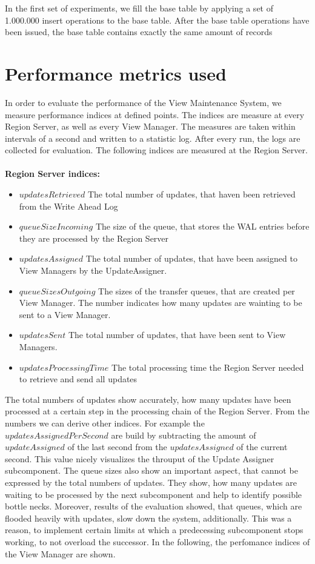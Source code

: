 \documentclass[11pt,a4paper,bibtotoc,idxtotoc,headsepline,footsepline,footexclude,BCOR12mm,DIV13]{scrbook}
\begin{document}
In the first set of experiments, we fill the base table by applying a set of 1.000.000 insert operations to the base table. After the base table operations have been issued, the base table contains exactly the same amount of records 

\section{Performance metrics used}
\label{sec:performancemetricsused}

In order to evaluate the performance of the View Maintenance System, we measure performance indices at defined points. The indices are measure at every Region Server, as well as every View Manager. The measures are taken within intervals of a second and written to a statistic log. After every run, the logs are collected for evaluation. The following indices are measured at the Region Server. \\\\
\textbf{Region Server indices:}
\begin{itemize}
	\item $updatesRetrieved$ The total number of updates, that haven been retrieved from the Write Ahead Log
	\item $queueSizeIncoming$ The size of the queue, that stores the WAL entries before they are processed by the Region Server
	\item $updatesAssigned$ The total number of updates, that have been assigned to View Managers by the UpdateAssigner.
	\item $queueSizesOutgoing$ The sizes of the transfer queues, that are created per View Manager. The number indicates how many updates are wainting to be sent to a View Manager.
	\item $updatesSent$ The total number of updates, that have been sent to View Managers.	
	\item $updatesProcessingTime$ The total processing time the Region Server needed to retrieve and send all updates
\end{itemize}
The total numbers of updates show accurately, how many updates have been processed at a certain step in the processing chain of the Region Server. From the numbers we can derive other indices. For example the $updatesAssignedPerSecond$ are build by subtracting the amount of $updateAssigned$ of the last second from the $updatesAssigned$ of the current second. This value nicely visualizes the throuput of the Update Assigner subcomponent. The queue sizes also show an important aspect, that cannot be expressed by the total numbers of updates. They show, how many updates are waiting to be processed by the next subcomponent and help to identify possible bottle necks. Moreover, results of the evaluation showed, that queues, which are flooded heavily with updates, slow down the system, additionally. This was a reason, to implement certain limits at which a predecessing subcomponent stops working, to not overload the successor. In the following, the perfomance indices of the View Manager are shown.\\\\
\end{document}
